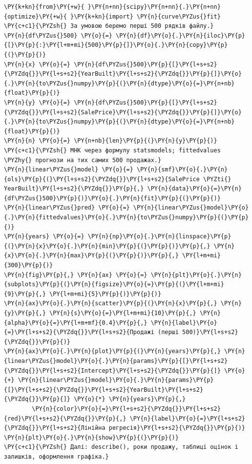 \begin{Verbatim}[commandchars=\\\{\}]
\PY{k+kn}{from}\PY{+w}{ }\PY{n+nn}{scipy}\PY{n+nn}{.}\PY{n+nn}{optimize}\PY{+w}{ }\PY{k+kn}{import} \PY{n}{curve\PYZus{}fit}
\PY{c+c1}{\PYZsh{} За умовою беремо перші 500 рядків файлу.}
\PY{n}{df\PYZus{}500} \PY{o}{=} \PY{n}{df}\PY{o}{.}\PY{n}{iloc}\PY{p}{[}\PY{p}{:}\PY{l+m+mi}{500}\PY{p}{]}\PY{o}{.}\PY{n}{copy}\PY{p}{(}\PY{p}{)}
\PY{n}{x} \PY{o}{=} \PY{n}{df\PYZus{}500}\PY{p}{[}\PY{l+s+s2}{\PYZdq{}}\PY{l+s+s2}{YearBuilt}\PY{l+s+s2}{\PYZdq{}}\PY{p}{]}\PY{o}{.}\PY{n}{to\PYZus{}numpy}\PY{p}{(}\PY{n}{dtype}\PY{o}{=}\PY{n+nb}{float}\PY{p}{)}
\PY{n}{y} \PY{o}{=} \PY{n}{df\PYZus{}500}\PY{p}{[}\PY{l+s+s2}{\PYZdq{}}\PY{l+s+s2}{SalePrice}\PY{l+s+s2}{\PYZdq{}}\PY{p}{]}\PY{o}{.}\PY{n}{to\PYZus{}numpy}\PY{p}{(}\PY{n}{dtype}\PY{o}{=}\PY{n+nb}{float}\PY{p}{)}
\PY{n}{n} \PY{o}{=} \PY{n+nb}{len}\PY{p}{(}\PY{n}{y}\PY{p}{)}
\PY{c+c1}{\PYZsh{} МНК через формулу statsmodels; fittedvalues \PYZhy{} прогнози на тих самих 500 продажах.}
\PY{n}{linear\PYZus{}model} \PY{o}{=} \PY{n}{smf}\PY{o}{.}\PY{n}{ols}\PY{p}{(}\PY{l+s+s2}{\PYZdq{}}\PY{l+s+s2}{SalePrice \PYZti{} YearBuilt}\PY{l+s+s2}{\PYZdq{}}\PY{p}{,} \PY{n}{data}\PY{o}{=}\PY{n}{df\PYZus{}500}\PY{p}{)}\PY{o}{.}\PY{n}{fit}\PY{p}{(}\PY{p}{)}
\PY{n}{linear\PYZus{}pred} \PY{o}{=} \PY{n}{linear\PYZus{}model}\PY{o}{.}\PY{n}{fittedvalues}\PY{o}{.}\PY{n}{to\PYZus{}numpy}\PY{p}{(}\PY{p}{)}
\PY{n}{years} \PY{o}{=} \PY{n}{np}\PY{o}{.}\PY{n}{linspace}\PY{p}{(}\PY{n}{x}\PY{o}{.}\PY{n}{min}\PY{p}{(}\PY{p}{)}\PY{p}{,} \PY{n}{x}\PY{o}{.}\PY{n}{max}\PY{p}{(}\PY{p}{)}\PY{p}{,} \PY{l+m+mi}{300}\PY{p}{)}
\PY{n}{fig}\PY{p}{,} \PY{n}{ax} \PY{o}{=} \PY{n}{plt}\PY{o}{.}\PY{n}{subplots}\PY{p}{(}\PY{n}{figsize}\PY{o}{=}\PY{p}{(}\PY{l+m+mi}{9}\PY{p}{,} \PY{l+m+mi}{5}\PY{p}{)}\PY{p}{)}
\PY{n}{ax}\PY{o}{.}\PY{n}{scatter}\PY{p}{(}\PY{n}{x}\PY{p}{,} \PY{n}{y}\PY{p}{,} \PY{n}{s}\PY{o}{=}\PY{l+m+mi}{10}\PY{p}{,} \PY{n}{alpha}\PY{o}{=}\PY{l+m+mf}{0.4}\PY{p}{,} \PY{n}{label}\PY{o}{=}\PY{l+s+s2}{\PYZdq{}}\PY{l+s+s2}{Продажі (перші 500)}\PY{l+s+s2}{\PYZdq{}}\PY{p}{)}
\PY{n}{ax}\PY{o}{.}\PY{n}{plot}\PY{p}{(}\PY{n}{years}\PY{p}{,} \PY{n}{linear\PYZus{}model}\PY{o}{.}\PY{n}{params}\PY{p}{[}\PY{l+s+s2}{\PYZdq{}}\PY{l+s+s2}{Intercept}\PY{l+s+s2}{\PYZdq{}}\PY{p}{]} \PY{o}{+} \PY{n}{linear\PYZus{}model}\PY{o}{.}\PY{n}{params}\PY{p}{[}\PY{l+s+s2}{\PYZdq{}}\PY{l+s+s2}{YearBuilt}\PY{l+s+s2}{\PYZdq{}}\PY{p}{]} \PY{o}{*} \PY{n}{years}\PY{p}{,}
        \PY{n}{color}\PY{o}{=}\PY{l+s+s2}{\PYZdq{}}\PY{l+s+s2}{red}\PY{l+s+s2}{\PYZdq{}}\PY{p}{,} \PY{n}{label}\PY{o}{=}\PY{l+s+s2}{\PYZdq{}}\PY{l+s+s2}{Лінійна регресія}\PY{l+s+s2}{\PYZdq{}}\PY{p}{)}
\PY{n}{plt}\PY{o}{.}\PY{n}{show}\PY{p}{(}\PY{p}{)}
\PY{c+c1}{\PYZsh{} Далі: describe(), роки продажу, таблиці оцінок і залишків, оформлення графіка.}
\end{Verbatim}
